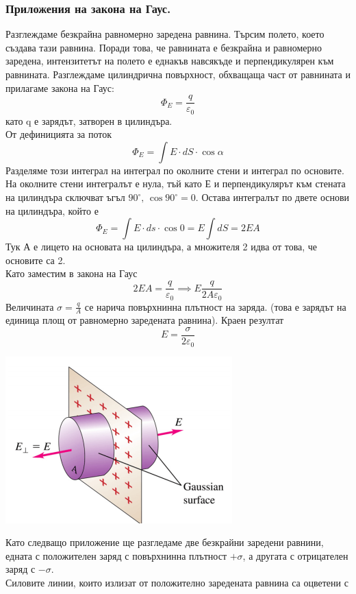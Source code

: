 \documentclass[fleqn, 12pt]{article}
\theoremstyle{definition}
\begin{document}
\subsubsection{Приложения на закона на Гаус.}

Разглеждаме безкрайна равномерно заредена равнина. Търсим полето, което създава
тази равнина. Поради това, че равнината е безкрайна и равномерно заредена,
интензитетът на полето е еднакъв
навсякъде и перпендикулярен към
равнината. Разглеждаме цилиндрична
повърхност, обхващаща част от
равнината и прилагаме закона на Гаус: 
$$\Phi_E = \frac{q}{\varepsilon_0}$$
като q е зарядът, затворен в цилиндъра.\\
От дефиницията за поток 
$$\Phi_E = \int E \cdot dS \cdot \cos \alpha $$ 
Разделяме този
интеграл на интеграл по околните стени
и интеграл по основите. На околните 
стени интегралът е нула, тъй като Е и перпендикулярът към стената на цилиндъра
сключват ъгъл $90^\circ, \, \cos 90^\circ = 0$. 
Остава интегралът по двете основи на цилиндъра, който е 
$$\Phi_E = \int E \cdot ds \cdot \cos0  = E \int dS = 2EA$$
Тук А е лицето на основата на цилиндъра, а
множителя 2 идва от това, че основите са 2.\\
Като заместим в закона на Гаус
$$2EA = \frac{q}{\varepsilon_0} \implies E \frac{q}{2A \varepsilon_0}$$
Величината $\sigma = \frac{q}{A}$ се нарича повърхнинна плътност на заряда. (това е
зарядът на единица площ от равномерно заредената равнина). Краен резултат
$$E = \frac{\sigma}{2 \varepsilon_0} $$
\begin{center}
  \includegraphics{Pics/physics/lec6-5-1.png}
\end{center}
Като следващо приложение ще разгледаме две безкрайни заредени равнини, едната с
положителен заряд с повърхнинна плътност $+ \sigma$, а другата с отрицателен заряд с $- \sigma$.\\
Силовите линии, които излизат от
положително заредената равнина са оцветени с
\end{document}

